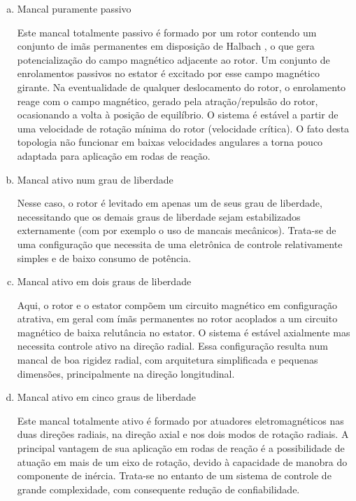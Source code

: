 \begin{enumerate}[a)]
	\item  Mancal puramente passivo
	
	Este mancal totalmente passivo é formado por um rotor contendo um conjunto de imãs permanentes em disposição de Halbach \citep{Detoni2012}, o que gera potencialização do campo magnético adjacente ao rotor. Um conjunto de enrolamentos passivos no estator é excitado por esse campo magnético girante. Na eventualidade de qualquer deslocamento do rotor, o enrolamento reage com o campo magnético, gerado pela atração/repulsão do rotor, ocasionando a volta à posição de equilíbrio. O sistema é estável a partir de uma velocidade de rotação mínima do rotor (velocidade crítica). O fato desta topologia não funcionar em baixas velocidades angulares a torna pouco adaptada para aplicação em rodas de reação.
	
	\item  Mancal ativo num grau de liberdade
	
	Nesse caso, o rotor é levitado em apenas um de seus grau de liberdade, necessitando que os demais graus de liberdade sejam estabilizados externamente (com por exemplo o uso de mancais mecânicos). Trata-se de uma configuração que necessita de uma eletrônica de controle relativamente simples e de baixo consumo de potência.
	
	\item Mancal ativo em dois graus de liberdade
	
	Aqui, o rotor e o estator compõem um circuito magnético em configuração atrativa, em geral com ímãs permanentes no rotor acoplados a um circuito magnético de baixa relutância no estator. O sistema é estável axialmente mas necessita controle ativo na direção radial. Essa configuração resulta num mancal de boa rigidez radial, com arquitetura simplificada e pequenas dimensões, principalmente na direção longitudinal.
	
	\item Mancal ativo em cinco graus de liberdade
	
	Este mancal totalmente ativo é formado por atuadores eletromagnéticos nas duas direções radiais, na direção axial e nos dois modos de rotação radiais. A principal vantagem de sua aplicação em rodas de reação é a possibilidade de atuação em mais de um eixo de rotação, devido à capacidade de manobra do componente de inércia. Trata-se no entanto de um sistema de controle de grande complexidade, com consequente redução de confiabilidade. 
\end{enumerate}

